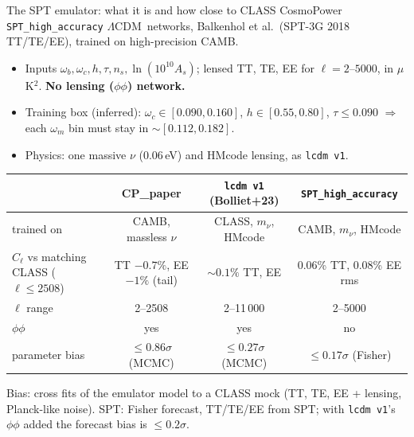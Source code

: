 \documentclass[aspectratio=169,10pt]{beamer}
\newcommand{\om}{\omega_m}
\newcommand{\lcdm}{$\Lambda$CDM}
\begin{document}
\begin{frame}{The SPT emulator: what it is and how close to CLASS}
\small
CosmoPower \texttt{SPT\_high\_accuracy} \lcdm\ networks, Balkenhol et al.\ (SPT-3G 2018 TT/TE/EE), trained on high-precision CAMB.
\begin{itemize}\small
  \item Inputs $\omega_b,\omega_c,h,\tau,n_s,\ln(10^{10}A_s)$; lensed TT, TE, EE for $\ell=2$--$5000$, in $\mu$K$^2$. \textbf{No lensing ($\phi\phi$) network.}
  \item Training box (inferred): $\omega_c\in[0.090,0.160]$, $h\in[0.55,0.80]$, $\tau\le0.090$ $\Rightarrow$ each $\om$ bin must stay in $\sim[0.112,0.182]$.
  \item Physics: one massive $\nu$ (0.06\,eV) and HMcode lensing, as \texttt{lcdm v1}.
\end{itemize}
\vspace{0.3em}
\centering\scriptsize
\setlength{\tabcolsep}{4pt}
\begin{tabular}{@{}lccc@{}}
\toprule
& CP\_paper & \texttt{lcdm v1} (Bolliet+23) & \texttt{SPT\_high\_accuracy} \\
\midrule
trained on & CAMB, massless $\nu$ & CLASS, $m_\nu$, HMcode & CAMB, $m_\nu$, HMcode \\
$C_\ell$ vs matching CLASS ($\ell\le2508$) & TT $-0.7\%$, EE $-1\%$ (tail) & $\sim0.1\%$ TT, EE & 0.06\% TT, 0.08\% EE rms \\
$\ell$ range & 2--2508 & 2--11\,000 & 2--5000 \\
$\phi\phi$ & yes & yes & no \\
parameter bias & $\le0.86\sigma$ (MCMC) & $\le0.27\sigma$ (MCMC) & $\le0.17\sigma$ (Fisher) \\
\bottomrule
\end{tabular}

\vspace{0.4em}
\raggedright
{\scriptsize Bias: cross fits of the emulator model to a CLASS mock (TT, TE, EE + lensing, Planck-like noise). SPT: Fisher forecast, TT/TE/EE from SPT;
with \texttt{lcdm v1}'s $\phi\phi$ added the forecast bias is $\le0.2\sigma$.}
\end{frame}
\end{document}
